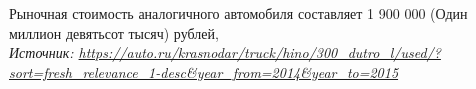 
Рыночная стоимость аналогичного автомобиля составляет 1 900 000 (Один миллион девятьсот тысяч) рублей,\\
\noindent\textit{Источник: \url{https://auto.ru/krasnodar/truck/hino/300_dutro_l/used/?sort=fresh_relevance_1-desc&year_from=2014&year_to=2015}}
\vspace{3mm}
%

